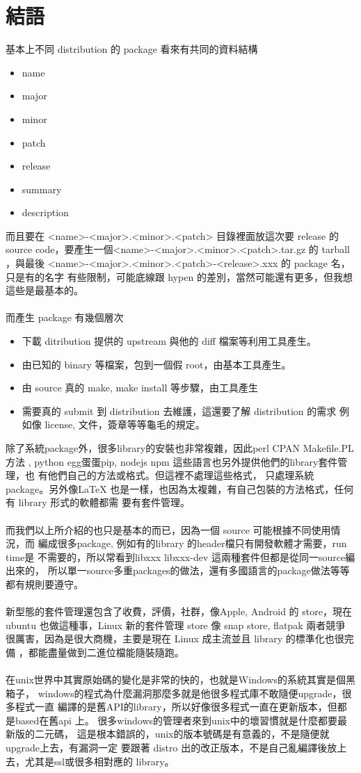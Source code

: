 \section{結語}
基本上不同 distribution 的 package 看來有共同的資料結構
\begin{itemize}
  \item name
  \item major
  \item minor
  \item patch
  \item release
  \item summary
  \item description
\end{itemize}
而且要在 <name>-<major>.<minor>.<patch> 目錄裡面放這次要 release 的 source
code，要產生一個<name>-<major>.<minor>.<patch>.tar.gz 的 tarball ，與最後
<name>-<major>.<minor>.<patch>-<release>.xxx 的 package 名，只是有的名字
有些限制，可能底線跟 hypen 的差別，當然可能還有更多，但我想這些是最基本的。
\\\\
而產生 package 有幾個層次
\begin{itemize}
  \item 下載 ditribution 提供的 upstream 與他的 diff 檔案等利用工具產生。
  \item 由已知的 binary 等檔案，包到一個假 root，由基本工具產生。
  \item 由 source 真的 make, make install 等步驟，由工具產生
  \item 需要真的 submit 到 distribution 去維護，這還要了解 distribution 的需求
        例如像 license, 文件，簽章等等龜毛的規定。
\end{itemize}
除了系統package外，很多library的安裝也非常複雜，因此perl CPAN Makefile.PL 方法
, python egg蛋蛋pip, nodejs npm 這些語言也另外提供他們的library套件管理，也
有他們自己的方法或格式。但這裡不處理這些格式， 只處理系統package。另外像LaTeX
也是一樣，也因為太複雜，有自己包裝的方法格式，任何有 library 形式的軟體都需
要有套件管理。
\\\\
而我們以上所介紹的也只是基本的而已，因為一個 source 可能根據不同使用情況，而
編成很多package, 例如有的library 的header檔只有開發軟體才需要，run time是
不需要的，所以常看到libxxx libxxx-dev 這兩種套件但都是從同一source編出來的，
所以單一source多重packages的做法，還有多國語言的package做法等等都有規則要遵守。
\\\\
新型態的套件管理還包含了收費，評價，社群，像Apple, Android 的 store，現在
ubuntu 也做這種事，Linux 新的套件管理 store 像 snap store, flatpak 兩者競爭
很厲害，因為是很大商機，主要是現在 Linux 成主流並且 library 的標準化也很完備
，都能盡量做到二進位檔能隨裝隨跑。
\\\\
在unix世界中其實原始碼的變化是非常的快的，也就是Windows的系統其實是個黑箱子，
windows的程式為什麼漏洞那麼多就是他很多程式庫不敢隨便upgrade，很多程式一直
編譯的是舊API的library，所以好像很多程式一直在更新版本，但都是based在舊api
上。 很多windows的管理者來到unix中的壞習慣就是什麼都要最新版的二元碼，
這是根本錯誤的，unix的版本號碼是有意義的，不是隨便就upgrade上去，有漏洞一定
要跟著 distro 出的改正版本，不是自己亂編譯後放上去，尤其是ssl或很多相對應的
library。
